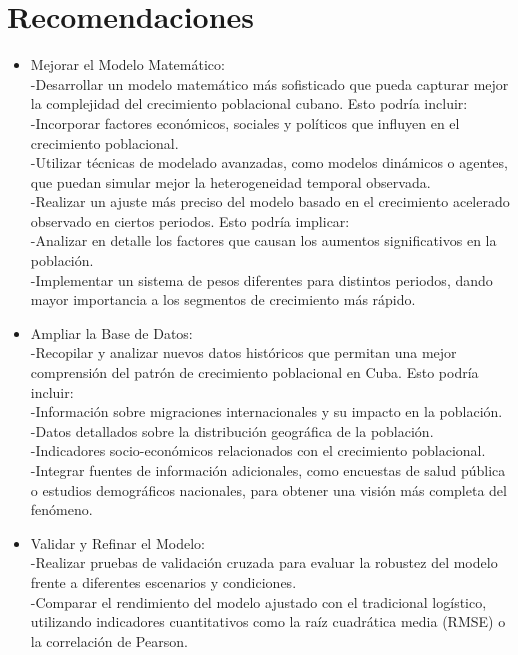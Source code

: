 \documentclass[a4paper,10pt,twocolumn]{article}
\begin{document}
\section{Recomendaciones}\label{sec:rec}
\begin{itemize}
	\item Mejorar el Modelo Matemático:\\
-Desarrollar un modelo matemático más sofisticado que pueda capturar mejor la complejidad del crecimiento poblacional cubano. Esto podría incluir:\\
-Incorporar factores económicos, sociales y políticos que influyen en el crecimiento poblacional.\\
-Utilizar técnicas de modelado avanzadas, como modelos dinámicos o agentes, que puedan simular mejor la heterogeneidad temporal observada.\\
-Realizar un ajuste más preciso del modelo basado en el crecimiento acelerado observado en ciertos periodos. Esto podría implicar:\\
-Analizar en detalle los factores que causan los aumentos significativos en la población.\\
-Implementar un sistema de pesos diferentes para distintos periodos, dando mayor importancia a los segmentos de crecimiento más rápido.
	\item Ampliar la Base de Datos:\\ 
-Recopilar y analizar nuevos datos históricos que permitan una mejor comprensión del patrón de crecimiento poblacional en Cuba. Esto podría incluir:\\
-Información sobre migraciones internacionales y su impacto en la población.\\
-Datos detallados sobre la distribución geográfica de la población.\\
-Indicadores socio-económicos relacionados con el crecimiento poblacional.\\
-Integrar fuentes de información adicionales, como encuestas de salud pública o estudios demográficos nacionales, para obtener una visión más completa del fenómeno.
	\item Validar y Refinar el Modelo:\\ 
-Realizar pruebas de validación cruzada para evaluar la robustez del modelo frente a diferentes escenarios y condiciones.\\
-Comparar el rendimiento del modelo ajustado con el tradicional logístico, utilizando indicadores cuantitativos como la raíz cuadrática media (RMSE) o la correlación de Pearson.\\

\end{itemize}
\end{document}
